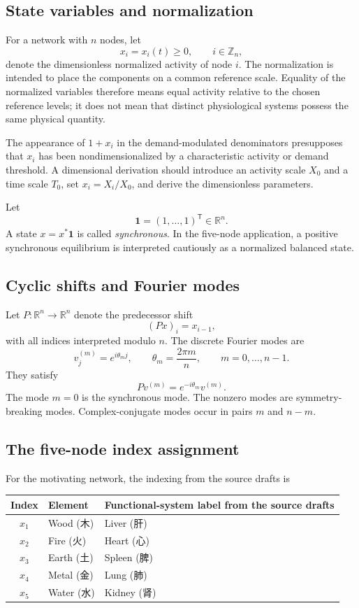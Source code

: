 \documentclass[11pt, reqno]{amsart}
\theoremstyle{definition}
\theoremstyle{remark}
\newcommand{\R}{\mathbb{R}}
\newcommand{\Z}{\mathbb{Z}}
\newcommand{\one}{\mathbf{1}}
\begin{document}
\subsection{State variables and normalization}

For a network with $n$ nodes, let
\[
    x_i=x_i(t)\ge 0, \qquad i\in\Z_n,
\]
denote the dimensionless normalized activity of node $i$.  The normalization is
intended to place the components on a common reference scale.  Equality of the
normalized variables therefore means equal activity relative to the chosen
reference levels; it does not mean that distinct physiological systems possess
the same physical quantity.

The appearance of $1+x_i$ in the demand-modulated denominators presupposes that
$x_i$ has been nondimensionalized by a characteristic activity or demand
threshold.  A dimensional derivation should introduce an activity scale $X_0$
and a time scale $T_0$, set $x_i=X_i/X_0$, and derive the dimensionless
parameters.


Let
\[
    \one=(1,\ldots,1)^{\mathsf T}\in\R^n.
\]
A state $x=x^*\one$ is called \emph{synchronous}.  In the five-node application,
a positive synchronous equilibrium is interpreted cautiously as a normalized
balanced state.

\subsection{Cyclic shifts and Fourier modes}

Let $P:\R^n\to\R^n$ denote the predecessor shift
\[
    (Px)_i=x_{i-1},
\]
with all indices interpreted modulo $n$.  The discrete Fourier modes are
\[
    v^{(m)}_j=e^{i\theta_m j},
    \qquad
    \theta_m=\frac{2\pi m}{n},
    \qquad
    m=0,\ldots,n-1.
\]
They satisfy
\[
    Pv^{(m)}=e^{-i\theta_m}v^{(m)}.
\]
The mode $m=0$ is the synchronous mode.  The nonzero modes are
symmetry-breaking modes.  Complex-conjugate modes occur in pairs
$m$ and $n-m$.

\subsection{The five-node index assignment}

For the motivating network, the indexing from the source drafts is
\begin{center}
\begin{tabular}{cll}
\toprule
Index & Element & Functional-system label from the source drafts \\
\midrule
$x_1$ & Wood (木)  & Liver (肝) \\
$x_2$ & Fire (火)  & Heart (心) \\
$x_3$ & Earth (土) & Spleen (脾) \\
$x_4$ & Metal (金) & Lung (肺) \\
$x_5$ & Water (水) & Kidney (肾) \\
\bottomrule
\end{tabular}
\end{center}
\end{document}
